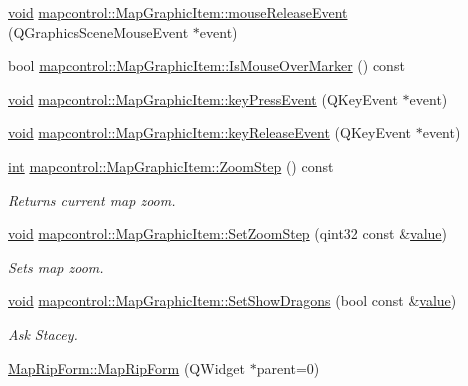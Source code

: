 \begin{DoxyCompactItemize}
\hyperlink{group___u_a_v_objects_plugin_ga444cf2ff3f0ecbe028adce838d373f5c}{void} \hyperlink{group___o_p_map_widget_gaba0f1f6f68f5a4765b966b704c7efddd}{mapcontrol\-::\-Map\-Graphic\-Item\-::mouse\-Release\-Event} (Q\-Graphics\-Scene\-Mouse\-Event $\ast$event)
\item 
bool \hyperlink{group___o_p_map_widget_ga974c2e697780b93234f9001d03d5e89f}{mapcontrol\-::\-Map\-Graphic\-Item\-::\-Is\-Mouse\-Over\-Marker} () const 
\item 
\hyperlink{group___u_a_v_objects_plugin_ga444cf2ff3f0ecbe028adce838d373f5c}{void} \hyperlink{group___o_p_map_widget_ga3c52576f9f0733ac4ea3882ce67a3ee0}{mapcontrol\-::\-Map\-Graphic\-Item\-::key\-Press\-Event} (Q\-Key\-Event $\ast$event)
\item 
\hyperlink{group___u_a_v_objects_plugin_ga444cf2ff3f0ecbe028adce838d373f5c}{void} \hyperlink{group___o_p_map_widget_ga2244e13f8bb36fe4230c1776f802e175}{mapcontrol\-::\-Map\-Graphic\-Item\-::key\-Release\-Event} (Q\-Key\-Event $\ast$event)
\item 
\hyperlink{ioapi_8h_a787fa3cf048117ba7123753c1e74fcd6}{int} \hyperlink{group___o_p_map_widget_gac33e6f99e690bfc9725bbb33b9078d91}{mapcontrol\-::\-Map\-Graphic\-Item\-::\-Zoom\-Step} () const 
\begin{DoxyCompactList}\small\item\em Returns current map zoom. \end{DoxyCompactList}\item 
\hyperlink{group___u_a_v_objects_plugin_ga444cf2ff3f0ecbe028adce838d373f5c}{void} \hyperlink{group___o_p_map_widget_ga45d9811a4fc7a2a8c6a677b4501a031d}{mapcontrol\-::\-Map\-Graphic\-Item\-::\-Set\-Zoom\-Step} (qint32 const \&\hyperlink{glext_8h_aa0e2e9cea7f208d28acda0480144beb0}{value})
\begin{DoxyCompactList}\small\item\em Sets map zoom. \end{DoxyCompactList}\item 
\hyperlink{group___u_a_v_objects_plugin_ga444cf2ff3f0ecbe028adce838d373f5c}{void} \hyperlink{group___o_p_map_widget_gaf6a44ff6d44e64585620480128100737}{mapcontrol\-::\-Map\-Graphic\-Item\-::\-Set\-Show\-Dragons} (bool const \&\hyperlink{glext_8h_aa0e2e9cea7f208d28acda0480144beb0}{value})
\begin{DoxyCompactList}\small\item\em Ask Stacey. \end{DoxyCompactList}\item 
\hyperlink{group___o_p_map_widget_ga992a9478361267f44a0935b7fb7c8476}{Map\-Rip\-Form\-::\-Map\-Rip\-Form} (Q\-Widget $\ast$parent=0)

\end{DoxyCompactItemize}
